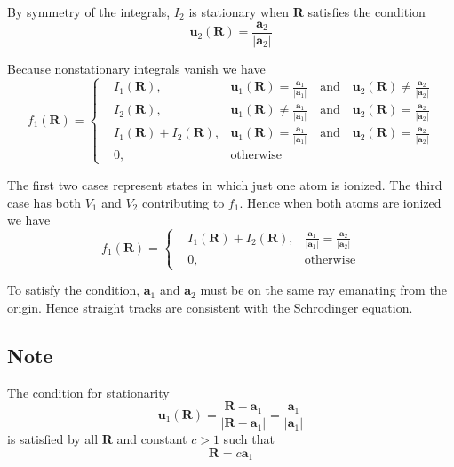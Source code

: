 By symmetry of the integrals, $I_2$ is stationary when $\mathbf R$ satisfies the condition
\begin{equation*}
\mathbf u_2(\mathbf R)
=\frac{\mathbf a_2}{|\mathbf a_2|}
\end{equation*}

Because nonstationary integrals vanish we have
\begin{equation*}
f_1(\mathbf R)=\left\{
\begin{aligned}
& I_1(\mathbf R),
& \mathbf u_1(\mathbf R)=\frac{\mathbf a_1}{|\mathbf a_1|}
\quad\text{and}\quad
\mathbf u_2(\mathbf R)\ne\frac{\mathbf a_2}{|\mathbf a_2|}
\\
& I_2(\mathbf R),
& \mathbf u_1(\mathbf R)\ne\frac{\mathbf a_1}{|\mathbf a_1|}
\quad\text{and}\quad
\mathbf u_2(\mathbf R)=\frac{\mathbf a_2}{|\mathbf a_2|}
\\
& I_1(\mathbf R)+I_2(\mathbf R),
& \mathbf u_1(\mathbf R)=\frac{\mathbf a_1}{|\mathbf a_1|}
\quad\text{and}\quad
\mathbf u_2(\mathbf R)=\frac{\mathbf a_2}{|\mathbf a_2|}
\\
& 0, & \text{otherwise}
\end{aligned}
\right.
\end{equation*}

The first two cases represent states in which just one atom is ionized.
The third case has both $V_1$ and $V_2$ contributing to $f_1$.
Hence when both atoms are ionized we have
\begin{equation*}
f_1(\mathbf R)=\left\{
\begin{aligned}
& I_1(\mathbf R)+I_2(\mathbf R),
& \frac{\mathbf a_1}{|\mathbf a_1|}=\frac{\mathbf a_2}{|\mathbf a_2|}
\\
& 0, & \text{otherwise}
\end{aligned}
\right.
\end{equation*}

To satisfy the condition, $\mathbf a_1$ and $\mathbf a_2$
must be on the same ray emanating from the origin.
Hence straight tracks are consistent with the Schrodinger equation.

\subsection*{Note}
The condition for stationarity
\begin{equation*}
\mathbf u_1(\mathbf R)
=\frac{\mathbf R-\mathbf a_1}{|\mathbf R-\mathbf a_1|}
=\frac{\mathbf a_1}{|\mathbf a_1|}
\end{equation*}
is satisfied by all $\mathbf R$ and constant $c>1$ such that
\begin{equation*}
\mathbf R=c\mathbf a_1
\end{equation*}

